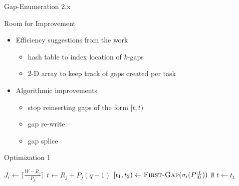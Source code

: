 \documentclass{beamer}
\begin{document}
\begin{section}{Gap-Enumeration 2.x}
\begin{frame}{Room for Improvement}
  \begin{itemize}
  \item{
    Efficiency suggestions from the work\autocite[17]{BelwalCheng}
    \begin{itemize}
    \item{hash table to index location of $k$-gaps}
    \item{2-D array to keep track of gaps created per task}
    \end{itemize}
  }
  \item{
    Algorithmic improvements
    \begin{itemize}
    \item{stop reinserting gaps of the form $[t,t)$}
    \item{gap re-write}
    \item{gap splice}
    \end{itemize}
  }
  \end{itemize}
\end{frame}
\begin{frame}{Optimization 1}
  \begin{algorithm}[H]
    \begin{multicols}{2}
    {\tiny
      \begin{algorithmic}[2]
          \State $J_{i} \gets \lceil\frac{W - R_{j}}{P_{j}}\rceil$
            \State $t \gets R_{j} + P_{j}(q-1)$
            \State $[t_{1},t_{2}) \gets \Call{First-Gap}{\sigma_{i}(P|_{0}^{L})}$
            \While{$[t_{1},t_{2}) \not= \Call{Nil}{\sigma_{i}(P|_{0}^{L})}$}
                \State \Return $\emptyset$
              \EndIf
                \State $t \gets t_{1}$
              \EndIf
                \State \Call{Gap-Delete}{$\sigma_{i}(P|_{0}^{L}), [t_{1},t_{2})$}
                    \State \Call{Gap-Insert}{$\sigma_{i}(P|_{0}^{L}), [t_{1},t)$}
                  \NewEndIf
                  \ExitWhile
                \EndIf
                      \State \Call{Gap-Insert}{$\sigma_{i}(P|_{0}^{L}), [t_{1},t)$}
                    \NewEndIf

\end{algorithmic}}
\end{multicols}
\end{algorithm}
\end{frame}
\end{section}
\end{document}
